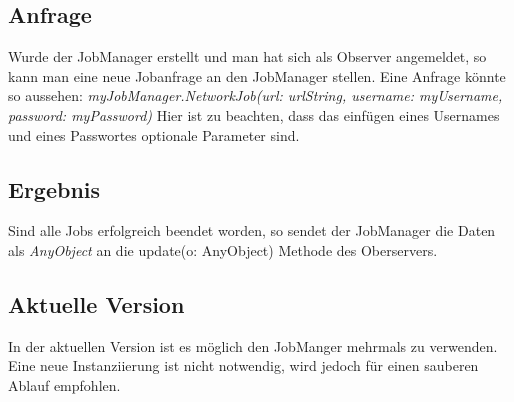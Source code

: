 \subsection{Anfrage}
Wurde der JobManager erstellt und man hat sich als Observer angemeldet, so kann man eine neue Jobanfrage an den JobManager stellen. Eine Anfrage könnte so aussehen:
\newline
\newline \textit{myJobManager.NetworkJob(url: urlString, username: myUsername, password: myPassword)}
\newline
\newline Hier ist zu beachten, dass das einfügen eines Usernames und eines Passwortes optionale Parameter sind. 

\subsection{Ergebnis}
Sind alle Jobs erfolgreich beendet worden, so sendet der JobManager die Daten als \textit{AnyObject} an die update(o: AnyObject) Methode des Oberservers. 
\newline
\subsection{Aktuelle Version}
In der aktuellen Version ist es möglich den JobManger mehrmals zu verwenden. Eine neue Instanziierung ist nicht notwendig, wird jedoch für einen sauberen Ablauf empfohlen.



